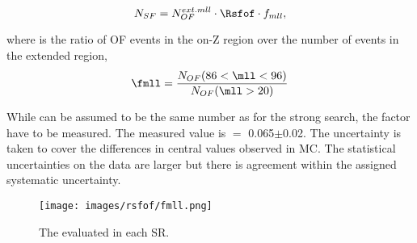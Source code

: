 \begin{equation}
\label{eq:estFSEwk}
    N_{SF} = N_{OF}^{ext.mll} \cdot \Rsfof \cdot f_{mll},
\end{equation}

where \fmll is the ratio of OF events in the on-Z region over the number of events in the extended \mll region, 
\begin{equation}
\fmll=\frac{N_{OF}(86<\mll<96)}{N_{OF}(\mll>20)}
\end{equation}

While \Rsfof can be assumed to be the same number as for the strong search, the factor \fmll have to be measured. 
The measured value is \fmll $=$ 0.065$\pm$0.02. The uncertainty is taken to cover the differences in central values observed in MC. 
The statistical uncertainties on the data are larger but there is agreement within the assigned systematic uncertainty.

\begin{figure}[htbp!]
\begin{center}
    \texttt{[image: images/rsfof/fmll.png]}
    \caption{The \fmll evaluated in each SR.}
\label{fig:fmll}
\end{center}
\end{figure}                                                 

